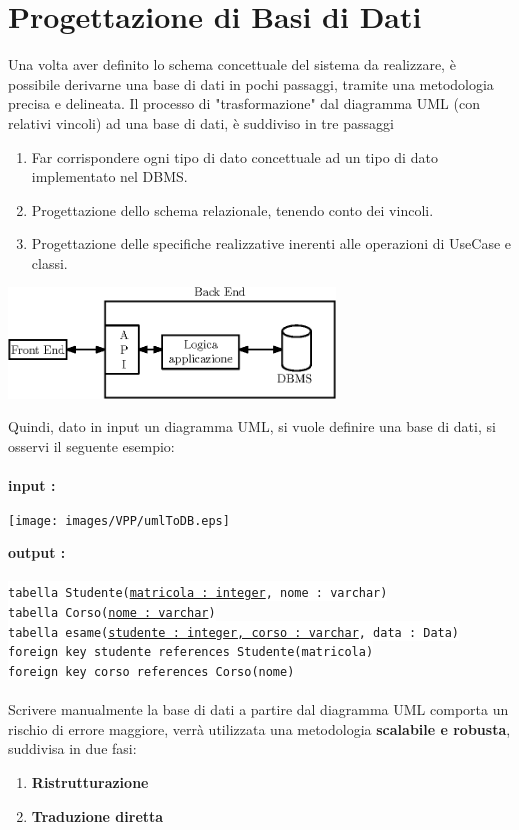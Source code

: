 \documentclass[12pt, letterpaper]{article}
\newcommand{\codee}[1]{\colorbox{white}{\texttt{#1}}}
\newcommand{\acc}{\\\hphantom{}\\}
\begin{document}
\section{Progettazione di Basi di Dati}
Una volta aver definito lo schema concettuale del sistema da realizzare, è possibile derivarne una base di dati in pochi 
passaggi, tramite una metodologia precisa e delineata. Il processo di "trasformazione" dal diagramma UML (con relativi vincoli) 
ad una base di dati, è suddiviso in tre passaggi\begin{enumerate}
    \item Far corrispondere ogni tipo di dato concettuale ad un tipo di dato implementato nel DBMS. 
    \item Progettazione dello schema relazionale, tenendo conto dei vincoli.
    \item Progettazione delle specifiche realizzative inerenti alle operazioni di UseCase e classi.
\end{enumerate}\begin{center}
    \includegraphics[width=0.65\textwidth ]{images/frontEndBackEnd.eps}
\end{center}
Quindi, dato in input un diagramma UML, si vuole definire una base di dati, si osservi il seguente esempio:\acc 
\textbf{input :}\begin{center}
    \texttt{[image: images/VPP/umlToDB.eps]}
\end{center}
\textbf{output :}\acc
    \codee{tabella Studente(\underline{matricola : integer}, nome : varchar)}\\ 
    \codee{tabella Corso(\underline{nome : varchar})}\\ 
    \codee{tabella esame(\underline{studente : integer, corso : varchar}, data : Data)}\\
    \hphantom{ident}\codee{foreign key studente references Studente(matricola)}\\ 
    \hphantom{ident}\codee{foreign key corso references Corso(nome)}\acc 
Scrivere manualmente la base di dati a partire dal diagramma UML comporta un rischio di errore maggiore, 
verrà utilizzata una metodologia \textbf{scalabile e robusta}, suddivisa in due fasi:\begin{enumerate}
    \item \textbf{Ristrutturazione}
    \item \textbf{Traduzione diretta}
\end{enumerate}
\end{document}
